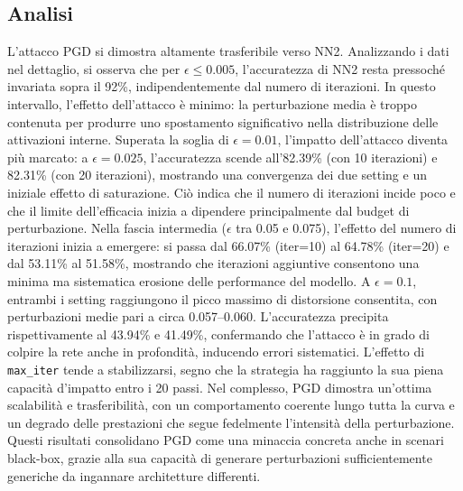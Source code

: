         \subsection{Analisi}
            L’attacco PGD si dimostra altamente trasferibile verso NN2.
            Analizzando i dati nel dettaglio, si osserva che per $\epsilon \leq 0.005$, l’accuratezza di NN2 resta pressoché invariata sopra il 92\%, indipendentemente dal numero di iterazioni. In questo intervallo, l’effetto dell’attacco è minimo: la perturbazione media è troppo contenuta per produrre uno spostamento significativo nella distribuzione delle attivazioni interne.
            Superata la soglia di $\epsilon = 0.01$, l’impatto dell’attacco diventa più marcato: a $\epsilon = 0.025$, l’accuratezza scende all’82.39\% (con 10 iterazioni) e 82.31\% (con 20 iterazioni), mostrando una convergenza dei due setting e un iniziale effetto di saturazione. Ciò indica che il numero di iterazioni incide poco e che il limite dell'efficacia inizia a dipendere principalmente dal budget di perturbazione.
            Nella fascia intermedia ($\epsilon$ tra 0.05 e 0.075), l’effetto del numero di iterazioni inizia a emergere: si passa dal 66.07\% (iter=10) al 64.78\% (iter=20) e dal 53.11\% al 51.58\%, mostrando che iterazioni aggiuntive consentono una minima ma sistematica erosione delle performance del modello.
            A $\epsilon = 0.1$, entrambi i setting raggiungono il picco massimo di distorsione consentita, con perturbazioni medie pari a circa 0.057–0.060. L’accuratezza precipita rispettivamente al 43.94\% e 41.49\%, confermando che l’attacco è in grado di colpire la rete anche in profondità, inducendo errori sistematici. L’effetto di \texttt{max\_iter} tende a stabilizzarsi, segno che la strategia ha raggiunto la sua piena capacità d’impatto entro i 20 passi.
            Nel complesso, PGD dimostra un’ottima scalabilità e trasferibilità, con un comportamento coerente lungo tutta la curva e un degrado delle prestazioni che segue fedelmente l’intensità della perturbazione.
            Questi risultati consolidano PGD come una minaccia concreta anche in scenari black-box, grazie alla sua capacità di generare perturbazioni sufficientemente generiche da ingannare architetture differenti.

